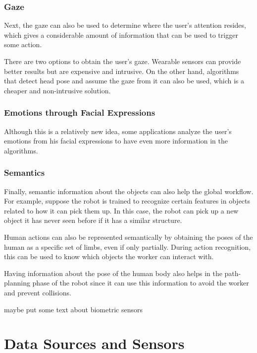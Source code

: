 \subsubsection{Gaze}

Next, the gaze can also be used to determine where the user's attention resides, which gives a considerable amount of information that can be used to trigger some action.

There are two options to obtain the user's gaze. Wearable sensors can provide better results but are expensive and intrusive. On the other hand, algorithms that detect head pose and assume the gaze from it can also be used, which is a cheaper and non-intrusive solution.

\subsubsection{Emotions through Facial Expressions}

Although this is a relatively new idea, some applications analyze the user's emotions from his facial expressions to have even more information in the algorithms.

\subsubsection{Semantics}

Finally, semantic information about the objects can also help the global workflow. For example, suppose the robot is trained to recognize certain features in objects related to how it can pick them up. In this case, the robot can pick up a new object it has never seen before if it has a similar structure.

Human actions can also be represented semantically by obtaining the poses of the human as a specific set of limbs, even if only partially. During action recognition, this can be used to know which objects the worker can interact with.

Having information about the pose of the human body also helps in the path-planning phase of the robot since it can use this information to avoid the worker and prevent collisions.

{\color{red} maybe put some text about biometric sensors}

\section{Data Sources and Sensors}

